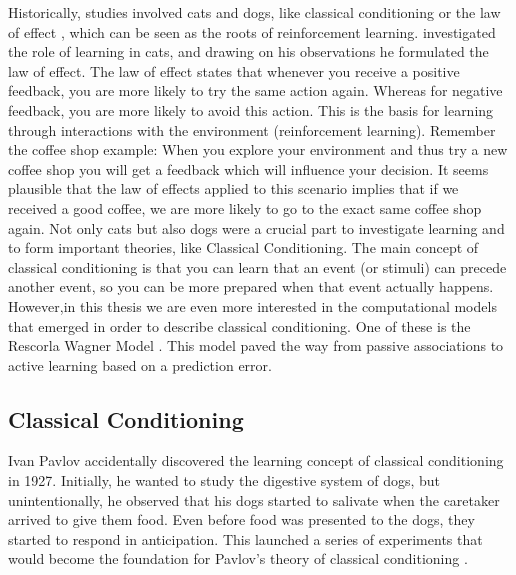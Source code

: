 Historically, studies involved cats and dogs, like classical conditioning \citep{pavlov1927conditional} or the law of effect \citep{thorndike1927law}, which can be seen as the roots of reinforcement learning. 
\citet{thorndike1927law} investigated the role of learning in cats, and drawing on his observations he formulated the law of effect.
The law of effect states that whenever you receive a positive feedback, you are more likely to try the same action again. Whereas for negative feedback, you are more likely to avoid this action.
This is the basis for learning through interactions with the environment (reinforcement learning). Remember the coffee shop example: When you explore your environment and thus try a new coffee shop you will get a feedback which will influence your decision. It seems plausible that the law of effects applied to this scenario implies that if we received a good coffee, we are more likely to go to the exact same coffee shop again. 
Not only cats but also dogs were a crucial part to investigate learning and to form important theories, like Classical Conditioning. 
The main concept of classical conditioning is that you can learn that an event (or stimuli) can precede another event, so you can be more prepared when that event actually happens. However,in this thesis we are even more interested in the computational models that emerged in order to describe classical conditioning. One of these is the Rescorla Wagner Model \citep{rescorla1972theory}. This model paved the way from passive associations to active learning based on a prediction error.

\subsection{Classical Conditioning}
Ivan Pavlov accidentally discovered the learning concept of classical conditioning in 1927. Initially, he wanted to study the digestive system of dogs, but unintentionally, he observed that his dogs started to salivate when the caretaker arrived to give them food. Even before food was presented to the dogs, they started to respond in anticipation. This launched a series of experiments that would become the foundation for Pavlov's theory of classical conditioning \citep{pavlov1927conditional}.  

